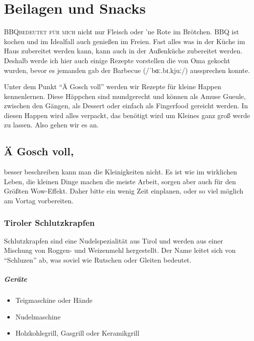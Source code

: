 \chapter{Beilagen und Snacks}\label{Chapter5}
\lettrine[lines=3]{BBQ}{bedeutet für mich} nicht nur Fleisch oder 'ne Rote im Brötchen. BBQ ist kochen und im Idealfall auch genießen im 
Freien. Fast alles was in der Küche im Haus zubereitet werden kann, kann auch in der Außenküche zubereitet werden.  Deshalb werde ich 
hier auch einige Rezepte vorstellen die von Oma gekocht wurden, bevor es jemanden gab der Barbecue (/ˈbɑː.bɪ.kjuː/)  aussprechen konnte.

Unter dem Punkt "`Ä Gosch voll"' werden wir Rezepte für kleine Happen kennenlernen.  Diese Häppchen sind mundgerecht und können als Amuse Gueule, 
zwischen den Gängen, als Dessert oder einfach als Fingerfood gereicht werden. In diesen Happen wird alles verpackt, das benötigt wird um Kleines ganz groß werde zu 
lassen. Also gehen wir es an.  

\section{Ä Gosch voll,}
besser beschreiben kann man die Kleinigkeiten nicht. Es ist wie im wirklichen Leben, die kleinen Dinge machen die meiste Arbeit, sorgen aber auch für den Größten 
Wow-Effekt. Daher bitte ein wenig Zeit einplanen, oder so viel möglich am Vortag vorbereiten. 

\subsection{Tiroler Schlutzkrapfen}

Schlutzkrapfen sind eine Nudelspezialität aus Tirol und werden aus einer 
Mischung von Roggen- und Weizenmehl hergestellt. Der Name leitet sich von 
"`Schluzen"' 
ab, was soviel wie Rutschen oder Gleiten bedeutet.

\paragraph{Geräte}

\begin{itemize}[noitemsep]
	\item Teigmaschine oder Hände
	\item Nudelmaschine
	\item Holzkohlegrill, Gasgrill oder Keramikgrill
\end{itemize}

